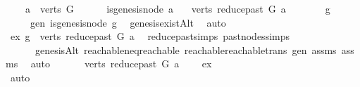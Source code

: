 \begin{isabellebody}
\ \ \ {\isachardoublequoteopen}\ a\ {\isasymin}\ verts\ G{\isachardoublequoteclose}\isanewline
\ \ \ \ \ \ {\isachardoublequoteopen}{\isasymnot}is{\isacharunderscore}{\kern0pt}genesis{\isacharunderscore}{\kern0pt}node\ a{\isachardoublequoteclose}\isanewline
\ \ \ {\isachardoublequoteopen}{\isacharparenleft}{\kern0pt}verts\ {\isacharparenleft}{\kern0pt}reduce{\isacharunderscore}{\kern0pt}past\ G\ a{\isacharparenright}{\kern0pt}{\isacharparenright}{\kern0pt}\ {\isasymnoteq}\ {\isacharbraceleft}{\kern0pt}{\isacharbraceright}{\kern0pt}{\isachardoublequoteclose}\isanewline
%
\isadelimproof
%
\endisadelimproof
%
\isatagproof
{}\isamarkupfalse%
\ {\isacharminus}{\kern0pt}\isanewline
\ \ \isamarkupfalse%
\ g\isanewline
\ \ \ \ \ gen{\isacharcolon}{\kern0pt}\ {\isachardoublequoteopen}is{\isacharunderscore}{\kern0pt}genesis{\isacharunderscore}{\kern0pt}node\ g{\isachardoublequoteclose}\ \isamarkupfalse%
\ genesis{\isacharunderscore}{\kern0pt}existAlt\ \isamarkupfalse%
\ auto\isanewline
\ \ \isamarkupfalse%
\ ex{\isacharcolon}{\kern0pt}\ {\isachardoublequoteopen}g\ {\isasymin}\ verts\ {\isacharparenleft}{\kern0pt}reduce{\isacharunderscore}{\kern0pt}past\ G\ a{\isacharparenright}{\kern0pt}{\isachardoublequoteclose}\ \isamarkupfalse%
\ reduce{\isacharunderscore}{\kern0pt}past{\isachardot}{\kern0pt}simps\ past{\isacharunderscore}{\kern0pt}nodes{\isachardot}{\kern0pt}simps\ \isanewline
\ \ \ \ \ \ genesisAlt\ reachable{\isacharunderscore}{\kern0pt}neq{\isacharunderscore}{\kern0pt}reachable{}\ reachable{\isacharunderscore}{\kern0pt}reachable{}{\isacharunderscore}{\kern0pt}trans\ gen\ assms{\isacharparenleft}{\kern0pt}{}{\isacharparenright}{\kern0pt}\ assms{\isacharparenleft}{\kern0pt}{}{\isacharparenright}{\kern0pt}\ \isamarkupfalse%
\ auto\ \isanewline
\ \ \isamarkupfalse%
\ \isamarkupfalse%
\ {\isachardoublequoteopen}{\isacharparenleft}{\kern0pt}verts\ {\isacharparenleft}{\kern0pt}reduce{\isacharunderscore}{\kern0pt}past\ G\ a{\isacharparenright}{\kern0pt}{\isacharparenright}{\kern0pt}\ {\isasymnoteq}\ {\isacharbraceleft}{\kern0pt}{\isacharbraceright}{\kern0pt}{\isachardoublequoteclose}\ \isamarkupfalse%
\ ex\ \isamarkupfalse%
\ auto\ \ \ \ \ \ \ \ \ \ \ \ \ \ \ \ \ \ \ \ \ \ \ \ \ \ \ \ \ \ \ \ \ \ \ \ \ \ \ \ \ \ \ \ \ \ \ \ \ \ \ \ \ \ \ \ \ \ \ \ \ \ \ \ \ \ \ \ \ \ \ \ \ \ \ \ \ \ \ \ \ \ \ \ \ \ \ \ \ \ \ \isanewline

\end{isabellebody}
